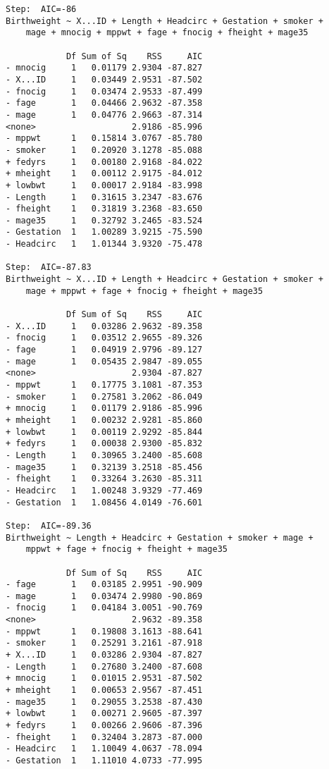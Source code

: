 \documentclass[11pt]{article}
\begin{document}
\begin{enumerate}
\begin{verbatim}
Step:  AIC=-86
Birthweight ~ X...ID + Length + Headcirc + Gestation + smoker + 
    mage + mnocig + mppwt + fage + fnocig + fheight + mage35

            Df Sum of Sq    RSS     AIC
- mnocig     1   0.01179 2.9304 -87.827
- X...ID     1   0.03449 2.9531 -87.502
- fnocig     1   0.03474 2.9533 -87.499
- fage       1   0.04466 2.9632 -87.358
- mage       1   0.04776 2.9663 -87.314
<none>                   2.9186 -85.996
- mppwt      1   0.15814 3.0767 -85.780
- smoker     1   0.20920 3.1278 -85.088
+ fedyrs     1   0.00180 2.9168 -84.022
+ mheight    1   0.00112 2.9175 -84.012
+ lowbwt     1   0.00017 2.9184 -83.998
- Length     1   0.31615 3.2347 -83.676
- fheight    1   0.31819 3.2368 -83.650
- mage35     1   0.32792 3.2465 -83.524
- Gestation  1   1.00289 3.9215 -75.590
- Headcirc   1   1.01344 3.9320 -75.478

Step:  AIC=-87.83
Birthweight ~ X...ID + Length + Headcirc + Gestation + smoker + 
    mage + mppwt + fage + fnocig + fheight + mage35

            Df Sum of Sq    RSS     AIC
- X...ID     1   0.03286 2.9632 -89.358
- fnocig     1   0.03512 2.9655 -89.326
- fage       1   0.04919 2.9796 -89.127
- mage       1   0.05435 2.9847 -89.055
<none>                   2.9304 -87.827
- mppwt      1   0.17775 3.1081 -87.353
- smoker     1   0.27581 3.2062 -86.049
+ mnocig     1   0.01179 2.9186 -85.996
+ mheight    1   0.00232 2.9281 -85.860
+ lowbwt     1   0.00119 2.9292 -85.844
+ fedyrs     1   0.00038 2.9300 -85.832
- Length     1   0.30965 3.2400 -85.608
- mage35     1   0.32139 3.2518 -85.456
- fheight    1   0.33264 3.2630 -85.311
- Headcirc   1   1.00248 3.9329 -77.469
- Gestation  1   1.08456 4.0149 -76.601

Step:  AIC=-89.36
Birthweight ~ Length + Headcirc + Gestation + smoker + mage + 
    mppwt + fage + fnocig + fheight + mage35

            Df Sum of Sq    RSS     AIC
- fage       1   0.03185 2.9951 -90.909
- mage       1   0.03474 2.9980 -90.869
- fnocig     1   0.04184 3.0051 -90.769
<none>                   2.9632 -89.358
- mppwt      1   0.19808 3.1613 -88.641
- smoker     1   0.25291 3.2161 -87.918
+ X...ID     1   0.03286 2.9304 -87.827
- Length     1   0.27680 3.2400 -87.608
+ mnocig     1   0.01015 2.9531 -87.502
+ mheight    1   0.00653 2.9567 -87.451
- mage35     1   0.29055 3.2538 -87.430
+ lowbwt     1   0.00271 2.9605 -87.397
+ fedyrs     1   0.00266 2.9606 -87.396
- fheight    1   0.32404 3.2873 -87.000
- Headcirc   1   1.10049 4.0637 -78.094
- Gestation  1   1.11010 4.0733 -77.995


\end{verbatim}
\end{enumerate}
\end{document}
